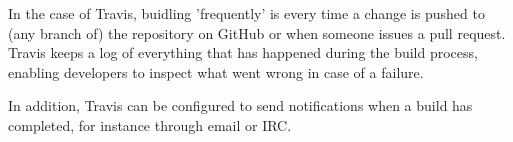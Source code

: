 In the case of Travis, buidling 'frequently' is every time a change is pushed to (any branch of) the repository on GitHub or when someone issues a pull request.
Travis keeps a log of everything that has happened during the build process, enabling developers to inspect what went wrong in case of a failure.

In addition, Travis can be configured to send notifications when a build has completed, for instance through email or IRC.
